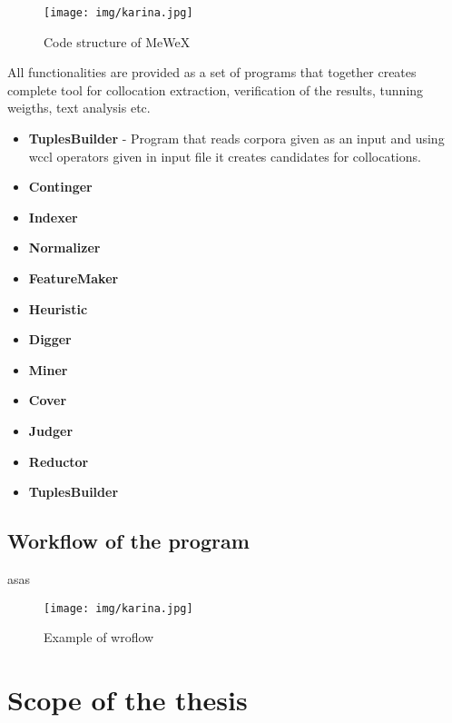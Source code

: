 \begin{figure}[ht]
	\centering
	\texttt{[image: img/karina.jpg]}
	\caption{Code structure of MeWeX}
	\label{img_structure}
\end{figure}

All functionalities are provided as a set of programs that together creates complete tool for collocation extraction,
verification of the results, tunning weigths, text analysis etc.
\begin{itemize}
    \item \textbf{TuplesBuilder} - Program that reads corpora given as an input and using wccl operators given in input file 
    it creates candidates for collocations.
 
    \item \textbf{Continger}
 
    \item \textbf{Indexer}
 
    \item \textbf{Normalizer}
 
    \item \textbf{FeatureMaker}
 
    \item \textbf{Heuristic}
 
    \item \textbf{Digger}
 
    \item \textbf{Miner}
 
    \item \textbf{Cover}
 
    \item \textbf{Judger}
 
    \item \textbf{Reductor}
 
    \item \textbf{TuplesBuilder}
 
    
\end{itemize}

\subsection{Workflow of the program} \label{mewex_workflow}
asas

\begin{figure}[ht]
	\centering
	\texttt{[image: img/karina.jpg]}
	\caption{Example of wroflow}
	\label{img_worflow1}
\end{figure}

\section{Scope of the thesis}

